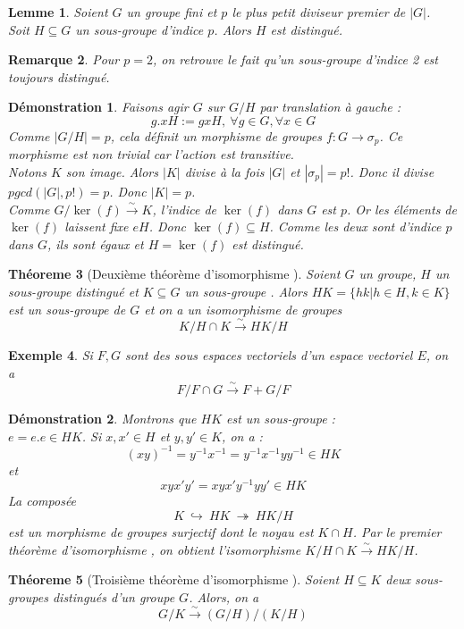\documentclass[a4paper, oneside]{report}
\theoremstyle{break}
\newtheorem{thm}{Théoreme}[section] %
\newtheorem{lemme}[thm]{Lemme}
\newtheorem{exem}[thm]{Exemple}
\newtheorem{remar}[thm]{Remarque}
\newtheorem*{demo}{Démonstration}
\newcommand{\sevs}{sous espaces vectoriels }
\newcommand{\ev}{espace vectoriel }
\newcommand{\mdg}{morphisme de groupes }
\newcommand{\isom}{isomorphisme }
\newcommand{\sg}{sous-groupe }
\newcommand{\sgs}{sous-groupes }
\newcommand{\fong}{\overset{\sim}{\rightarrow}}
\newcommand{\inj}{\hookrightarrow}
\newcommand{\surj}{\twoheadrightarrow}
\begin{document}
\begin{lemme}
Soient $G$ un groupe fini et $p$ le plus petit diviseur premier de $|G|$.\\
Soit $H\subseteq G$ un \sg d'indice $p$. Alors $H$ est distingué.
\end{lemme}

\begin{remar}
Pour $p=2$, on retrouve le fait qu'un \sg d'indice 2 est toujours distingué.
\end{remar}

\begin{demo}
Faisons agir $G$ sur $G/H$ par translation à gauche :
$$g.xH := gxH,~\forall g\in G,\forall x\in G$$
Comme $|G/H|=p$, cela définit un \mdg $f:G\rightarrow \sigma_p$. Ce morphisme est non trivial car l'action est transitive.\\
Notons $K$ son image. Alors $|K|$ divise à la fois $|G|$ et $|\sigma_p|=p!$. Donc il divise $pgcd(|G|,p!)=p$. Donc $|K|=p$.\\
Comme $G/\ker(f)\fong K$, l'indice de $\ker (f)$ dans $G$ est $p$. Or les éléments de $\ker(f)$ laissent fixe $eH$. Donc $\ker (f)\subseteq H$. Comme les deux sont d'indice $p$ dans $G$, ils sont égaux et $H=\ker (f)$ est distingué.
\end{demo}

\begin{thm}[Deuxième théorème d'\isom]
Soient $G$ un groupe, $H$ un \sg distingué et $K\subseteq G$ un \sg. Alors $HK=\{hk| h\in H, k\in K\}$ est un \sg de $G$ et on a un \isom de groupes 
$$K/H\cap K \fong HK/H$$
\end{thm}

\begin{exem}
Si $F,G$ sont des \sevs d'un \ev $E$, on a 
$$F/F\cap G \fong F+G/F$$
\end{exem}

\begin{demo}
Montrons que $HK$ est un \sg :\\
$e=e.e \in HK$. Si $x,x'\in H$ et $y,y' \in K$, on a :
$$(xy)^{-1}=y^{-1}x^{-1}=y^{-1}x^{-1}yy^{-1}\in HK$$
et 
$$xyx'y'=xyx'y^{-1}yy'\in HK$$
La composée 
$$K~\inj~HK~\surj~HK/H$$
est un \mdg surjectif dont le noyau est $K\cap H$. Par le premier théorème d'\isom, on obtient l'\isom $K/H\cap K \fong HK/H$.
\end{demo}

\begin{thm}[Troisième théorème d'\isom]
Soient $H\subseteq K$ deux \sgs distingués d'un groupe $G$. Alors, on a 
$$G/K \fong (G/H) \big/ (K/H)$$
\end{thm}
\end{document}

